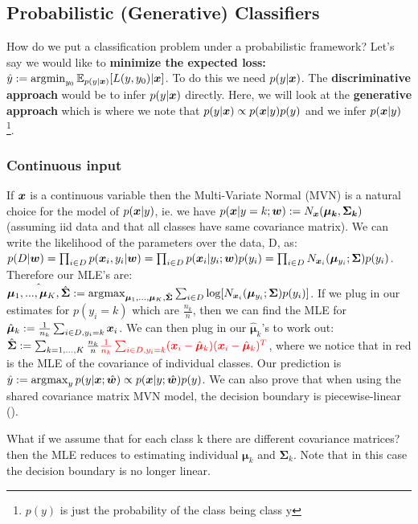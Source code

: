 \subsection{Probabilistic (Generative) Classifiers}
How do we put a classification problem under a probabilistic framework? Let's say we would like to \textbf{minimize the expected loss:} $\hat{y} := \operatorname*{arg\!\min}_{y_{0}} \mathbb{E}_{p(y|\bm{x})} [L(y,y_{0})|\bm{x}]$. To do this we need $p(y|\bm{x})$. The \textbf{discriminative approach} would be to infer $p(y|\bm{x})$ directly. Here, we will look at the \textbf{generative approach} which is where we note that $p(y|\bm{x}) \propto p(\bm{x}|y) p(y)$ and we infer $p(\bm{x}|y)$ \footnote{$p(y)$ is just the probability of the class being class y}.

\subsubsection{Continuous input} \label{subsubsection:Continuous input}
If $\bm{x}$ is a continuous variable then the Multi-Variate Normal (MVN) is a natural choice for the model of $p(\bm{x}|y)$, ie. we have $p(\bm{x} | y=k;\bm{w}) := N_{\bm{x}}(\bm{\mu_{k}}, \bm{\Sigma_{k}})$ (assuming iid data and that all classes have same covariance matrix). We can write the likelihood of the parameters over the data, D, as: $p(D|\bm{w}) = \prod_{i \in D}p(\bm{x}_{i} , y_{i}|\bm{w}) = \prod_{i \in D} p(\bm{x}_{i} | y_{i} ;\bm{w})p(y_{i}) = \prod_{i \in D} N_{\bm{x}_{i}} (\bm{\mu}_{y_{i}};\bm{\Sigma}) p(y_{i})$. Therefore our MLE's are: $\hat{\bm{\mu}_{1}, ..., \bm{\mu}_{K},\hat{\bm{\Sigma}}} := \operatorname*{arg\!\max}_{\bm{\mu}_{1}, ..., \bm{\mu}_{K},\hat{\bm{\Sigma}}} \sum_{i \in D} \log [ N_{\bm{x}_{i}} (\bm{\mu}_{y_{i}} ; \bm{\Sigma}) p(y_{i})]$. If we plug in our estimates for $p(y_{i}=k)$ which are $\frac{n_{k}}{n}$, then we can find the MLE for $\hat{\bm{\mu}}_{k} := \frac{1}{n_{k}} \sum_{i \in D, y_{i}=k} \bm{x}_{i}$. We can then plug in our $\hat{\bm{\mu}}_{k}$'s to work out: $\hat{\bm{\Sigma}} := \sum_{k=1,...,K} \frac{n_{k}}{n} \color{red} \frac{1}{n_{k}} \sum_{i \in D, y_{i}=k} (\bm{x}_{i} - \hat{\bm{\mu}}_{k})(\bm{x}_{i} - \hat{\bm{\mu}}_{k})^{T} \color{black}$, where we notice that in red is the MLE of the covariance of individual classes. Our prediction is $\hat{y} := \operatorname*{arg\!\max}_{y} p(y| \bm{x} ; \hat{\bm{w}}) \propto p(\bm{x} | y ; \hat{\bm{w}}) p(y)$. We can also prove that when using the shared covariance matrix MVN model, the decision boundary is piecewise-linear ().

What if we assume that for each class k there are different covariance matrices? then the MLE reduces to estimating individual $\bm{\mu}_{k}$ and $\bm{\Sigma}_{k}$. Note that in this case the decision boundary is no longer linear.

